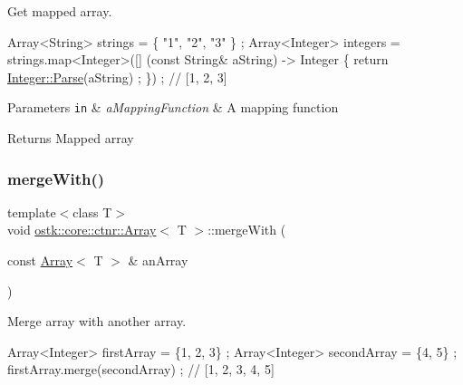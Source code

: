 Get mapped array. 


\begin{DoxyCode}
Array<String> strings = \{ \textcolor{stringliteral}{"1"}, \textcolor{stringliteral}{"2"}, \textcolor{stringliteral}{"3"} \} ;
Array<Integer> integers = strings.map<Integer>([] (\textcolor{keyword}{const} String& aString) -> Integer \{ \textcolor{keywordflow}{return} 
      \hyperlink{classostk_1_1core_1_1types_1_1_integer_aa2c633a4aa1d2fd969c067c5b45e28a8}{Integer::Parse}(aString) ; \}) ; \textcolor{comment}{// [1, 2, 3]}
\end{DoxyCode}



\begin{DoxyParams}[1]{Parameters}
\mbox{\tt in}  & {\em a\+Mapping\+Function} & A mapping function \\
\hline
\end{DoxyParams}
\begin{DoxyReturn}{Returns}
Mapped array 
\end{DoxyReturn}
\mbox{\label{classostk_1_1core_1_1ctnr_1_1_array_a7b436feb27e4b0c81cf218bc61b6f5f2}} 
\subsubsection{\texorpdfstring{merge\+With()}{mergeWith()}}
{\footnotesize\ttfamily template$<$class T$>$ \\
void \hyperlink{classostk_1_1core_1_1ctnr_1_1_array}{ostk\+::core\+::ctnr\+::\+Array}$<$ T $>$\+::merge\+With (\begin{DoxyParamCaption}\item[{const \hyperlink{classostk_1_1core_1_1ctnr_1_1_array}{Array}$<$ T $>$ \&}]{an\+Array }\end{DoxyParamCaption})}



Merge array with another array. 


\begin{DoxyCode}
Array<Integer> firstArray = \{1, 2, 3\} ;
Array<Integer> secondArray = \{4, 5\} ;
firstArray.merge(secondArray) ; \textcolor{comment}{// [1, 2, 3, 4, 5]}
\end{DoxyCode}



